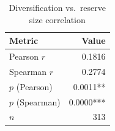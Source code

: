 \begin{table}[htbp]
\centering
\caption{Diversification vs.\ reserve size correlation}
\label{tab:correlation}
\begin{tabular}{lr}
\toprule
\textbf{Metric} & \textbf{Value} \\
\midrule
Pearson $r$ & 0.1816 \\
Spearman $r$ & 0.2774 \\
$p$ (Pearson) & 0.0011** \\
$p$ (Spearman) & 0.0000*** \\
$n$ & 313 \\
\bottomrule
\end{tabular}
\end{table}
